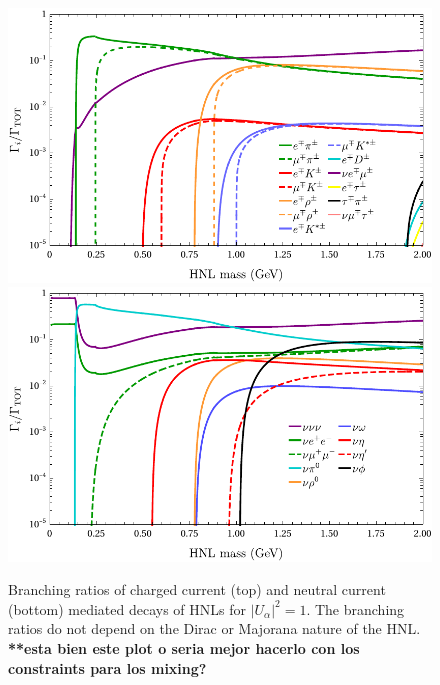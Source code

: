 \documentclass[aps,prd,twocolumn,superscriptaddress,amsmath,amssymb]{revtex4}
\newcommand{\lw}{\linewidth}
\begin{document}
\begin{figure}[h]
\includegraphics[width=\lw]{plots/plotCC.pdf}
\includegraphics[width=\lw]{plots/plotNC.pdf}
\caption{Branching ratios of charged current (top) and neutral current (bottom) mediated decays of HNLs for $|U_\alpha|^2=1$. The branching ratios do not depend on the Dirac or Majorana nature of the HNL.\\
\textbf{**esta bien este plot o seria mejor hacerlo con los constraints para los mixing?}}
\label{fig:brCCNC}
\end{figure}
\end{document}
